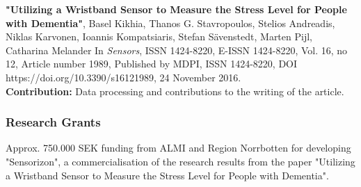 \documentclass{article}
\begin{document}
\textbf{ "Utilizing a Wristband Sensor to Measure the Stress Level for People with Dementia"},
Basel Kikhia, Thanos G. Stavropoulos, Stelios Andreadis, Niklas Karvonen, Ioannis Kompatsiaris, Stefan Sävenstedt, Marten Pijl, Catharina Melander
In \textit{Sensors}, ISSN 1424-8220, E-ISSN 1424-8220, Vol. 16, no 12, Article number 1989,
Published by MDPI, ISSN 1424-8220,
DOI https://doi.org/10.3390/s16121989,
24 November 2016.\\
\textbf{Contribution:} Data processing and contributions to the writing of the article.

\subsubsection{Research Grants}
Approx. 750.000 SEK funding from ALMI and Region Norrbotten for developing "Sensorizon", a commercialisation of the research results from the paper "Utilizing a Wristband Sensor to Measure the Stress Level for People with Dementia".
\end{document}
